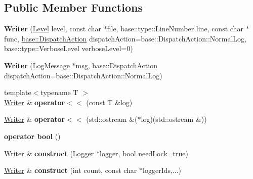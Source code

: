 \subsection*{Public Member Functions}
\begin{DoxyCompactItemize}
\item 
\hypertarget{classel_1_1base_1_1Writer_a50ce36cd8d9e60391da37658623a88a0}{{\bfseries Writer} (\hyperlink{namespaceel_ab0ac6091262344c52dd2d3ad099e8e36}{Level} level, const char $\ast$file, base\-::type\-::\-Line\-Number line, const char $\ast$func, \hyperlink{namespaceel_1_1base_a3aa2563d38e47388ba242a1694fc2839}{base\-::\-Dispatch\-Action} dispatch\-Action=base\-::\-Dispatch\-Action\-::\-Normal\-Log, base\-::type\-::\-Verbose\-Level verbose\-Level=0)}\label{classel_1_1base_1_1Writer_a50ce36cd8d9e60391da37658623a88a0}

\item 
\hypertarget{classel_1_1base_1_1Writer_a5eda18d17eb58ef183d6e36195003be4}{{\bfseries Writer} (\hyperlink{classel_1_1LogMessage}{Log\-Message} $\ast$msg, \hyperlink{namespaceel_1_1base_a3aa2563d38e47388ba242a1694fc2839}{base\-::\-Dispatch\-Action} dispatch\-Action=base\-::\-Dispatch\-Action\-::\-Normal\-Log)}\label{classel_1_1base_1_1Writer_a5eda18d17eb58ef183d6e36195003be4}

\item 
\hypertarget{classel_1_1base_1_1Writer_ab94f0d920c6465a57937e893aa9f5ada}{{\footnotesize template$<$typename T $>$ }\\\hyperlink{classel_1_1base_1_1Writer}{Writer} \& {\bfseries operator$<$$<$} (const T \&log)}\label{classel_1_1base_1_1Writer_ab94f0d920c6465a57937e893aa9f5ada}

\item 
\hypertarget{classel_1_1base_1_1Writer_aea6d7f996ff92e9485a76ad3955f0a29}{\hyperlink{classel_1_1base_1_1Writer}{Writer} \& {\bfseries operator$<$$<$} (std\-::ostream \&($\ast$log)(std\-::ostream \&))}\label{classel_1_1base_1_1Writer_aea6d7f996ff92e9485a76ad3955f0a29}

\item 
\hypertarget{classel_1_1base_1_1Writer_ac518e6b23327127f63c6d26ee83ecbf9}{{\bfseries operator bool} ()}\label{classel_1_1base_1_1Writer_ac518e6b23327127f63c6d26ee83ecbf9}

\item 
\hypertarget{classel_1_1base_1_1Writer_a282d82f392a3e6fef9eda47ce53e87dc}{\hyperlink{classel_1_1base_1_1Writer}{Writer} \& {\bfseries construct} (\hyperlink{classel_1_1Logger}{Logger} $\ast$logger, bool need\-Lock=true)}\label{classel_1_1base_1_1Writer_a282d82f392a3e6fef9eda47ce53e87dc}

\item 
\hypertarget{classel_1_1base_1_1Writer_ab2bc960787eb3c9b01569629dcbeb246}{\hyperlink{classel_1_1base_1_1Writer}{Writer} \& {\bfseries construct} (int count, const char $\ast$logger\-Ids,...)}\label{classel_1_1base_1_1Writer_ab2bc960787eb3c9b01569629dcbeb246}

\end{DoxyCompactItemize}

